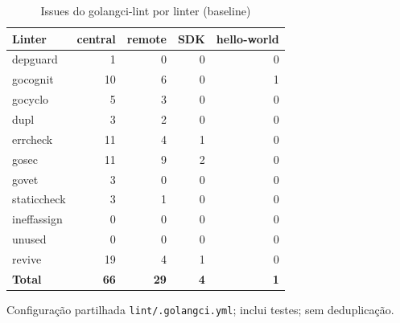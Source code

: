 \begin{table}[htbp]
  \centering\small
  \caption{Issues do golangci-lint por linter (baseline)}
  \label{tab:baseline-lint}
  \begin{tabular}{lrrrr}
    \toprule
    Linter & central & remote & SDK & hello-world \\
    \midrule
    depguard & 1 & 0 & 0 & 0 \\
    gocognit & 10 & 6 & 0 & 1 \\
    gocyclo & 5 & 3 & 0 & 0 \\
    dupl & 3 & 2 & 0 & 0 \\
    errcheck & 11 & 4 & 1 & 0 \\
    gosec & 11 & 9 & 2 & 0 \\
    govet & 3 & 0 & 0 & 0 \\
    staticcheck & 3 & 1 & 0 & 0 \\
    ineffassign & 0 & 0 & 0 & 0 \\
    unused & 0 & 0 & 0 & 0 \\
    revive & 19 & 4 & 1 & 0 \\
    \textbf{Total} & \textbf{66} & \textbf{29} & \textbf{4} & \textbf{1} \\
    \bottomrule
  \end{tabular}
  \par\smallskip\footnotesize Configuração partilhada \texttt{lint/.golangci.yml}; inclui testes; sem deduplicação.
\end{table}
